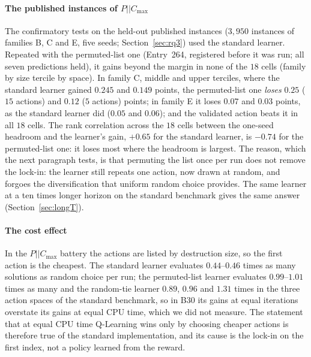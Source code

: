 

\paragraph{The published instances of $P||C_{\max}$} The confirmatory tests on the held-out published instances ($3{,}950$ instances of families B, C and E, five seeds; Section~\ref{sec:rq3}) used the standard learner. Repeated with the permuted-list one (Entry~264, registered before it was run; all seven predictions held), it gains beyond the margin in none of the $18$ cells (family by size tercile by space). In family C, middle and upper terciles, where the standard learner gained $0.245$ and $0.149$ points, the permuted-list one \emph{loses} $0.25$ ($15$ actions) and $0.12$ ($5$ actions) points; in family E it loses $0.07$ and $0.03$ points, as the standard learner did ($0.05$ and $0.06$); and the validated action beats it in all $18$ cells. The rank correlation across the $18$ cells between the one-seed headroom and the learner's gain, $+0.65$ for the standard learner, is $-0.74$ for the permuted-list one: it loses most where the headroom is largest. The reason, which the next paragraph tests, is that permuting the list once per run does not remove the lock-in: the learner still repeats one action, now drawn at random, and forgoes the diversification that uniform random choice provides. The same learner at a ten times longer horizon on the standard benchmark gives the same answer (Section~\ref{sec:longT}).

\paragraph{The cost effect} In the $P||C_{\max}$ battery the actions are listed by destruction size, so the first action is the cheapest. The standard learner evaluates $0.44$--$0.46$ times as many solutions as random choice per run; the permuted-list learner evaluates $0.99$--$1.01$ times as many and the random-tie learner $0.89$, $0.96$ and $1.31$ times in the three action spaces of the standard benchmark, so in B30 its gains at equal iterations overstate its gains at equal CPU time, which we did not measure. The statement that at equal CPU time Q-Learning wins only by choosing cheaper actions is therefore true of the standard implementation, and its cause is the lock-in on the first index, not a policy learned from the reward.

